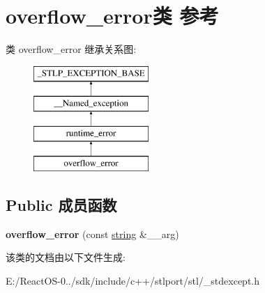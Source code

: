 \hypertarget{classoverflow__error}{}\section{overflow\+\_\+error类 参考}
\label{classoverflow__error}
类 overflow\+\_\+error 继承关系图\+:\begin{figure}[H]
\begin{center}
\leavevmode
\includegraphics[height=4.000000cm]{classoverflow__error}
\end{center}
\end{figure}
\subsection*{Public 成员函数}
\begin{DoxyCompactItemize}
\item 
\mbox{\label{classoverflow__error_a340e36ce767cf5b3ce18c0d4c3d9b6e0}} 
{\bfseries overflow\+\_\+error} (const \hyperlink{structstring}{string} \&\+\_\+\+\_\+arg)
\end{DoxyCompactItemize}


该类的文档由以下文件生成\+:\begin{DoxyCompactItemize}
\item 
E\+:/\+React\+O\+S-\/0../sdk/include/c++/stlport/stl/\+\_\+stdexcept.\+h\end{DoxyCompactItemize}
